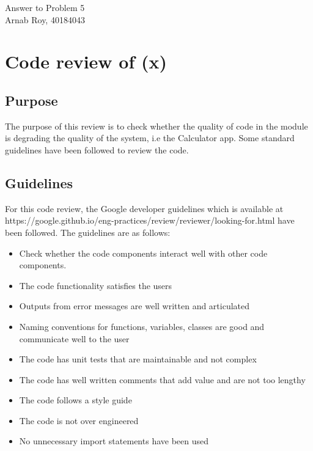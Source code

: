 \documentclass[12pt]{article}
\begin{document}
\begin{center}
    \huge{Answer to Problem 5}\\
\large{Arnab Roy, 40184043}
\end{center}

\section{Code review of \Gamma(x)}
\subsection{Purpose}
The purpose of this review is to check whether the quality of code in the module is degrading the quality of the system, i.e the Calculator app. Some standard guidelines have been followed to review the code. 
\subsection{Guidelines}
For this code review, the Google developer guidelines which is available at https://google.github.io/eng-practices/review/reviewer/looking-for.html have been followed. The guidelines are as follows:
\begin{itemize}
    \item Check whether the code components interact well with other code components.
    \item The code functionality satisfies the users
    \item Outputs from error messages are well written and articulated
    \item Naming conventions for functions, variables, classes are good and communicate well to the user
    \item The code has unit tests that are maintainable and not complex
    \item The code has well written comments that add value and are not too lengthy
    \item The code follows a style guide
    \item The code is not over engineered
    \item No unnecessary import statements have been used
\end{itemize}
\end{document}
